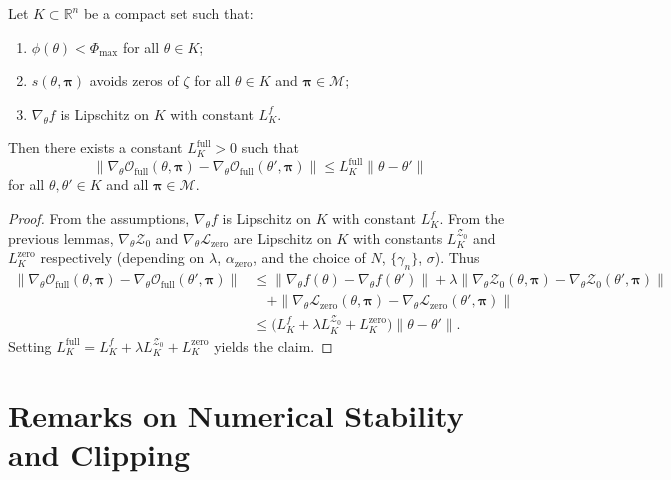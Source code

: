 \documentclass[11pt]{article}
\begin{document}
\begin{theorem}
Let $K\subset\mathbb{R}^n$ be a compact set such that:
\begin{enumerate}
  \item $\phi(\theta)<\Phi_{\max}$ for all $\theta\in K$;
  \item $s(\theta,\bm{\pi})$ avoids zeros of $\zeta$ for all $\theta\in K$ and $\bm{\pi}\in\mathcal{M}$;
  \item $\nabla_\theta f$ is Lipschitz on $K$ with constant $L^f_K$.
\end{enumerate}
Then there exists a constant $L^{\mathrm{full}}_K>0$ such that
\[
  \|\nabla_\theta\mathcal{O}_{\mathrm{full}}(\theta,\bm{\pi}) -
    \nabla_\theta\mathcal{O}_{\mathrm{full}}(\theta',\bm{\pi})\|
  \le L^{\mathrm{full}}_K \|\theta-\theta'\|
\]
for all $\theta,\theta'\in K$ and all $\bm{\pi}\in\mathcal{M}$.
\end{theorem}

\begin{proof}
From the assumptions, $\nabla_\theta f$ is Lipschitz on $K$ with constant $L^f_K$. From the previous lemmas, $\nabla_\theta\mathcal{Z}_0$ and $\nabla_\theta\mathcal{L}_{\mathrm{zero}}$ are Lipschitz on $K$ with constants $L^{\mathcal{Z}_0}_K$ and $L^{\mathrm{zero}}_K$ respectively (depending on $\lambda$, $\alpha_{\mathrm{zero}}$, and the choice of $N$, $\{\gamma_n\}$, $\sigma$). Thus
\begin{align*}
\|\nabla_\theta\mathcal{O}_{\mathrm{full}}(\theta,\bm{\pi}) -
  \nabla_\theta\mathcal{O}_{\mathrm{full}}(\theta',\bm{\pi})\|
&\le \|\nabla_\theta f(\theta) - \nabla_\theta f(\theta')\|
  + \lambda \|\nabla_\theta\mathcal{Z}_0(\theta,\bm{\pi}) -
              \nabla_\theta\mathcal{Z}_0(\theta',\bm{\pi})\|\\
&\quad + \|\nabla_\theta\mathcal{L}_{\mathrm{zero}}(\theta,\bm{\pi}) -
          \nabla_\theta\mathcal{L}_{\mathrm{zero}}(\theta',\bm{\pi})\| \\
&\le \big(L^f_K + \lambda L^{\mathcal{Z}_0}_K + L^{\mathrm{zero}}_K\big)\|\theta-\theta'\|.
\end{align*}
Setting $L^{\mathrm{full}}_K = L^f_K + \lambda L^{\mathcal{Z}_0}_K + L^{\mathrm{zero}}_K$ yields the claim.
\end{proof}

\section{Remarks on Numerical Stability and Clipping}
\end{document}
